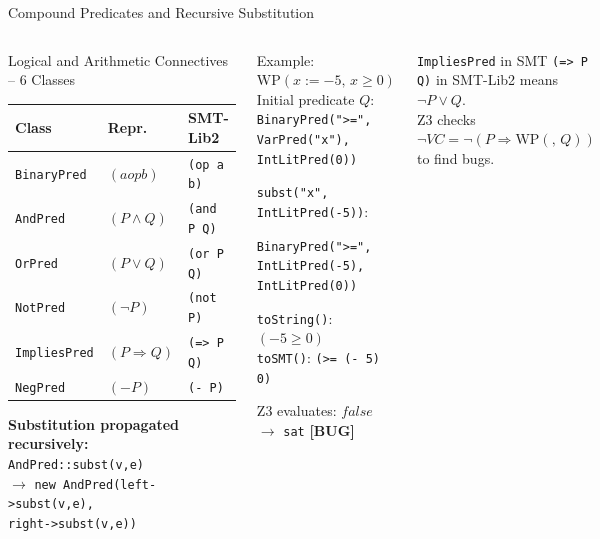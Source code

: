 \documentclass[aspectratio=169,11pt]{beamer}
\newcommand{\WP}[2]{\mathrm{WP}(#1,\,#2)}
\newcommand{\bug}{\textcolor{warn}{\textbf{[BUG]}}}
\begin{document}
\begin{frame}{Compound Predicates and Recursive Substitution}
\begin{columns}[t]
  \begin{block}{Logical and Arithmetic Connectives -- 6 Classes}
    \medskip
    \begin{tabular}{lll}
      \textbf{Class} & \textbf{Repr.} & \textbf{SMT-Lib2} \\
      \hline
      \texttt{BinaryPred} & $(a \mathbin{op} b)$ & \texttt{(op a b)} \\
      \texttt{AndPred}    & $(P \wedge Q)$      & \texttt{(and P Q)} \\
      \texttt{OrPred}     & $(P \vee Q)$        & \texttt{(or P Q)} \\
      \texttt{NotPred}    & $(\neg P)$          & \texttt{(not P)} \\
      \texttt{ImpliesPred}& $(P \Rightarrow Q)$ & \texttt{(=> P Q)} \\
      \texttt{NegPred}    & $(-P)$              & \texttt{(- P)} \\
    \end{tabular}
    \medskip

    \textbf{Substitution propagated recursively:}\\[4pt]
    \small \texttt{AndPred::subst(v,e)}\\
    \quad$\to$ \texttt{new AndPred(left->subst(v,e),}\\
    \quad\qquad\texttt{right->subst(v,e))}
    \medskip
  \end{block}

  \begin{exampleblock}{Example: $\WP{x:=-5}{x \geq 0}$}
    \medskip
    \small
    Initial predicate $Q$:\\
    \quad\texttt{BinaryPred(">=", VarPred("x"), IntLitPred(0))}

    \medskip
    \texttt{subst("x", IntLitPred(-5))}:

    \medskip
    \quad\texttt{BinaryPred(">=", IntLitPred(-5), IntLitPred(0))}

    \medskip
    \texttt{toString()}: \quad$(-5 \geq 0)$\\
    \texttt{toSMT()}: \quad\texttt{(>= (- 5) 0)}

    \medskip
    Z3 evaluates: $\mathit{false}$ $\to$ \texttt{sat} \bug
    \medskip
  \end{exampleblock}
  \begin{alertblock}{\small \texttt{ImpliesPred} in SMT}
    \small \texttt{(=> P Q)} in SMT-Lib2 means $\neg P \vee Q$.\\
    Z3 checks $\neg\mathit{VC} = \neg(P \Rightarrow \WP{}{Q})$ to find bugs.
  \end{alertblock}
\end{columns}
\end{frame}
\end{document}
